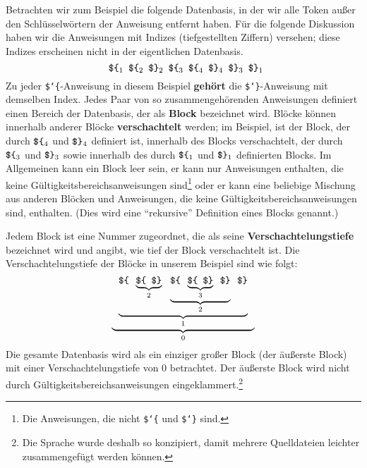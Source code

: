 Betrachten wir zum Beispiel die folgende Datenbasis, in der wir alle Token außer den Schlüsselwörtern der Anweisung entfernt haben.  Für die folgende Diskussion haben wir die Anweisungen mit Indizes (tiefgestellten Ziffern) versehen; diese Indizes erscheinen nicht in der eigentlichen Datenbasis.
\[
 \mbox{\tt \ \$\char`\{}_1
 \mbox{\tt \ \$\char`\{}_2
 \mbox{\tt \ \$\char`\}}_2
 \mbox{\tt \ \$\char`\{}_3
 \mbox{\tt \ \$\char`\{}_4
 \mbox{\tt \ \$\char`\}}_4
 \mbox{\tt \ \$\char`\}}_3
 \mbox{\tt \ \$\char`\}}_1
\]
Zu jeder \texttt{\$\char`\{}-Anweisung in diesem Beispiel {\bf gehört} die \texttt{\$\char`\}}-Anweisung mit demselben Index.  Jedes Paar von so zusammengehörenden Anweisungen definiert einen Bereich der Datenbasis, der als {\bf Block} bezeichnet wird. Blöcke können innerhalb anderer Blöcke {\bf verschachtelt} werden; im Beispiel, ist der Block, der durch $\mbox{\tt \$\char`\{}_4$ und $\mbox{\tt \$\char`\}}_4$ definiert ist, innerhalb des Blocks verschachtelt, der durch $\mbox{\tt \$\char`\{}_3$ und $\mbox{\tt \$\char`\}}_3$ sowie innerhalb des durch $\mbox{\tt \$\char`\{}_1$ und $\mbox{\tt \$\char`\}}_1$ definierten Blocks.  Im Allgemeinen kann ein Block leer sein, er kann nur Anweisungen enthalten, die keine Gültigkeitsbereichsanweisungen sind\footnote{Die Anweisungen, die nicht \texttt{\$\char`\{} und \texttt{\$\char`\}} sind.} oder er kann eine beliebige Mischung aus anderen Blöcken und Anweisungen, die keine Gültigkeitsbereichsanweisungen sind, enthalten.  (Dies wird eine "`rekursive"' Definition eines Blocks genannt.)

Jedem Block ist eine Nummer zugeordnet, die als seine {\bf Verschachtelungs\-tiefe} bezeichnet wird und angibt, wie tief der Block verschachtelt ist. Die Verschachtelungstiefe der Blöcke in unserem Beispiel sind wie folgt:
\[
  \underbrace{
    \mbox{\tt \ }
    \underbrace{
     \mbox{\tt \$\char`\{\ }
     \underbrace{
       \mbox{\tt \$\char`\{\ }
       \mbox{\tt \$\char`\}}
     }_{2}
     \mbox{\tt \ }
     \underbrace{
       \mbox{\tt \$\char`\{\ }
       \underbrace{
         \mbox{\tt \$\char`\{\ }
         \mbox{\tt \$\char`\}}
       }_{3}
       \mbox{\tt \ \$\char`\}}
     }_{2}
     \mbox{\tt \ \$\char`\}}
   }_{1}
   \mbox{\tt \ }
 }_{0}
\]
Die gesamte Datenbasis wird als ein einziger großer Block (der äußerste Block) mit einer Verschachtelungstiefe von 0 betrachtet. Der äußerste Block wird nicht durch Gültigkeitsbereichsanweisungen eingeklammert.\footnote{Die Sprache wurde deshalb so konzipiert, damit mehrere Quelldateien leichter zusammengefügt werden können.}

